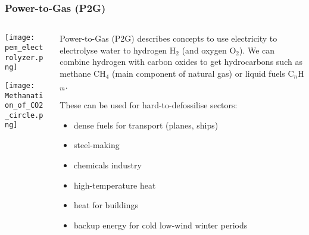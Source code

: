 \documentclass[10pt,aspectratio=169,dvipsnames]{beamer}
\let\olditem\item
\renewcommand{\item}{%
\olditem\vspace{5pt}}
\begin{document}
\begin{frame}
  \frametitle{Power-to-Gas (P2G)}

  \begin{columns}[T]
    \begin{column}{4cm}
      \texttt{[image: pem\_electrolyzer.png]}


      \vspace{.4cm}

      \texttt{[image: Methanation\_of\_CO2\_circle.png]}
    \end{column}
    \begin{column}{7cm}

      Power-to-Gas (P2G) describes concepts to use electricity to
      electrolyse water to \alert{hydrogen} H$_2$ (and oxygen O$_2$).
      We can combine hydrogen with carbon oxides to get
      \alert{hydrocarbons} such as methane CH$_4$ (main component of
      natural gas) or liquid fuels C$_n$H$_m$.

      These can be used for \alert{hard-to-defossilise sectors}:
            \begin{itemize}
            \item
              \alert{dense fuels} for transport (planes, ships)
            \item \alert{steel-making}
              \item \alert{chemicals industry}
              \item \alert{high-temperature heat}
              \item \alert{heat for buildings}
                \item \alert{backup energy} for cold low-wind winter periods
            \end{itemize}
    \end{column}
  \end{columns}

\end{frame}
\end{document}
